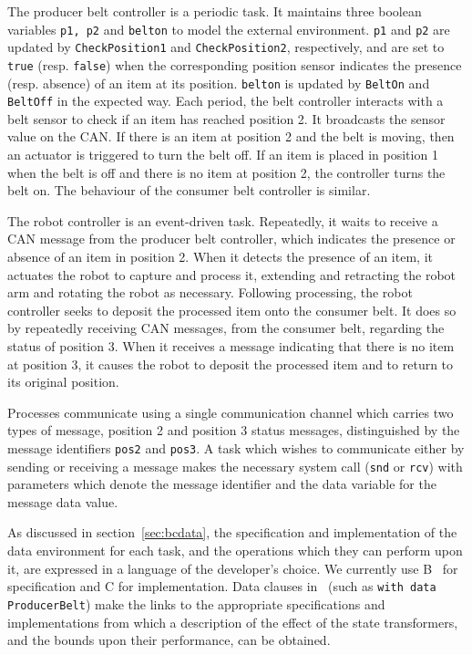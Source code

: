 The producer belt controller is a periodic task. It maintains three boolean
variables {\tt p1, p2\/} and {\tt belton\/} to model the external
environment. {\tt p1\/} and {\tt p2\/} are updated by {\tt CheckPosition1\/}
and {\tt CheckPosition2\/}, respectively, and are set to {\tt true\/}
(resp. {\tt false\/}) when the corresponding position sensor indicates the
presence (resp. absence) of an item at its position. {\tt belton\/} is updated
by {\tt BeltOn\/} and {\tt BeltOff\/} in the expected way. Each period, the
belt controller interacts with a belt sensor to check if an item has reached
position 2. It broadcasts the sensor value on the CAN. If there is an item at
position 2 and the belt is moving, then an actuator is triggered to turn the
belt off.  If an item is placed in position 1 when the belt is off and there
is no item at position 2, the controller turns the belt on. The behaviour of
the consumer belt controller is similar.

The robot controller is an event-driven task. Repeatedly, it waits to receive
a CAN message from the producer belt controller, which indicates the presence
or absence of an item in position 2.  When it detects the presence of an item,
it actuates the robot to capture and process it, extending and retracting the
robot arm and rotating the robot as necessary. Following processing, the robot
controller seeks to deposit the processed item onto the consumer belt. It does
so by repeatedly receiving CAN messages, from the consumer belt, regarding the
status of position 3. When it receives a message indicating that there is no
item at position 3, it causes the robot to deposit the processed item and to
return to its original position.

Processes communicate using a single communication channel which carries two
types of message, position 2 and position 3 status messages, distinguished by
the message identifiers {\tt pos2\/} and {\tt pos3\/}. A task which wishes to
communicate either by sending or receiving a message makes the necessary
system call ({\tt snd\/} or {\tt rcv\/}) with parameters which denote the
message identifier and the data variable for the message data value.

As discussed in section~\ref{sec:bcdata}, the specification and
implementation of the data environment for each task, and the operations which
they can perform upon it, are expressed in a language of the developer's
choice. We currently use B~\cite{abr:96} for specification and C for
implementation. Data clauses in \candle\ (such as {\tt with data ProducerBelt})
make the links to the appropriate specifications and implementations from
which a description of the effect of the state transformers, and the bounds
upon their performance, can be obtained.


